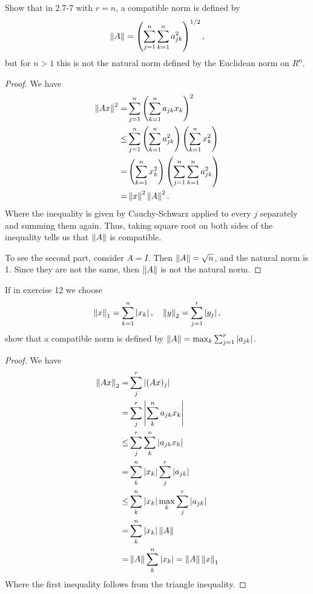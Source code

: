 \begin{exercise}{13}
Show that in 2.7-7 with $r=n$, a compatible norm is defined by 
\[
\left\lVert A\right\rVert = \left( \sum^n_{j=1}\sum^n_{k=1}a^2_{jk}\right)^{1/2},
\]
but for $n>1$ this is not the natural norm defined by the Euclidean norm on $R^n$.
\end{exercise}
\begin{proof}
We have 
\begin{align*}
    \left\lVert Ax\right\rVert^2
    =& \sum_{j=1}^n \left( \sum_{k=1}^n a_{jk}x_k\right)^2\\
    \leq& \sum_{j=1}^n \left( \sum_{k=1}^n a_{jk}^2\right)\left( \sum_{k=1}^n x_k^2\right)\\
    =& \left( \sum_{k=1}^n x_k^2\right)\left( \sum_{j=1}^n\sum_{k=1}^n a_{jk}^2\right)\\
    =& \left\lVert x\right\rVert^2\left\lVert A\right\rVert^2.
\end{align*}
Where the inequality is given by Cauchy-Schwarz applied to every $j$ separately and summing them again. 
Thus, taking square root on both sides of the inequality tells us that $\left\lVert A\right\rVert$ is compatible.

To see the second part, consider $A=I$.
Then $\left\lVert A\right\rVert=\sqrt{n}$, and the natural norm is 1.
Since they are not the same, then $\left\lVert A\right\rVert$ is not the natural norm.
\end{proof}

\begin{exercise}{14}
If in exercise 12 we choose 
\[
\left\lVert x\right\rVert_1=\sum^n_{k=1}\left\lvert x_k\right\rvert,\quad \left\lVert y\right\rVert_2=\sum^r_{j=1}\left\lvert y_j\right\rvert,
\]
show that a compatible norm is defined by $\left\lVert A\right\rVert=\max_k\sum^r_{j=1}\left\lvert a_{jk}\right\rvert$.
\end{exercise}
\begin{proof}
We have 
\begin{align*}
    \left\lVert Ax\right\rVert_2
    =& \sum_j^r \left\lvert (Ax)_j\right\rvert\\
    =& \sum_j^r \left\lvert \sum_k^n a_{jk}x_k\right\rvert\\
    \leq& \sum_j^r \sum_k^n \left\lvert a_{jk}x_k\right\rvert\\
    =& \sum_k^n \left\lvert x_k\right\rvert\sum_j^r \left\lvert a_{jk}\right\rvert\\
    \leq& \sum_k^n \left\lvert x_k\right\rvert \max_k\sum_j^r \left\lvert a_{jk}\right\rvert\\
    =& \sum_k^n \left\lvert x_k\right\rvert \left\lVert A\right\rVert\\
    =& \left\lVert A\right\rVert\sum_k^n \left\lvert x_k\right\rvert =\left\lVert A\right\rVert\left\lVert x\right\rVert_1
\end{align*}
Where the first inequality follows from the triangle inequality.
\end{proof}

